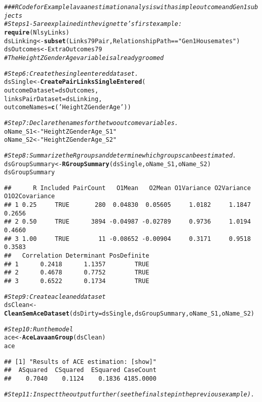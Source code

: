 \documentclass{article}\usepackage[]{graphicx}\usepackage[]{color}
\makeatletter
\newcommand{\hlstr}[1]{\textcolor[rgb]{0.192,0.494,0.8}{#1}}%
\newcommand{\hlcom}[1]{\textcolor[rgb]{0.678,0.584,0.686}{\textit{#1}}}%
\newcommand{\hlopt}[1]{\textcolor[rgb]{0,0,0}{#1}}%
\newcommand{\hlstd}[1]{\textcolor[rgb]{0.345,0.345,0.345}{#1}}%
\newcommand{\hlkwb}[1]{\textcolor[rgb]{0.69,0.353,0.396}{#1}}%
\newcommand{\hlkwc}[1]{\textcolor[rgb]{0.333,0.667,0.333}{#1}}%
\newcommand{\hlkwd}[1]{\textcolor[rgb]{0.737,0.353,0.396}{\textbf{#1}}}%
\newenvironment{kframe}{%
 \def\at@end@of@kframe{}%
 \ifinner\ifhmode%
  \def\at@end@of@kframe{\end{minipage}}%
  \begin{minipage}{\columnwidth}%
 \fi\fi%
 \def\FrameCommand##1{\hskip\@totalleftmargin \hskip-\fboxsep
 \colorbox{shadecolor}{##1}\hskip-\fboxsep
     \hskip-\linewidth \hskip-\@totalleftmargin \hskip\columnwidth}%
 \MakeFramed {\advance\hsize-\width
   \@totalleftmargin\z@ \linewidth\hsize
   \@setminipage}}%
 {\par\unskip\endMakeFramed%
 \at@end@of@kframe}
\newenvironment{knitrout}{}{} %
\makeatother
\begin{document}
\begin{knitrout}
\color{fgcolor}\begin{kframe}
\begin{alltt}
\hlcom{### R Code for Example lavaan estimation analysis with a simple outcome and Gen1 subjects}
\hlcom{#Steps 1-5 are explained in the vignette's first example:}
\hlkwd{require}\hlstd{(NlsyLinks)}
\hlstd{dsLinking} \hlkwb{<-} \hlkwd{subset}\hlstd{(Links79Pair, RelationshipPath}\hlopt{==}\hlstr{"Gen1Housemates"}\hlstd{)}
\hlstd{dsOutcomes} \hlkwb{<-} \hlstd{ExtraOutcomes79}
\hlcom{#The HeightZGenderAge variable is already groomed}

\hlcom{#Step 6: Create the single entered dataset.}
\hlstd{dsSingle} \hlkwb{<-} \hlkwd{CreatePairLinksSingleEntered}\hlstd{(}
  \hlkwc{outcomeDataset}   \hlstd{= dsOutcomes,}
  \hlkwc{linksPairDataset} \hlstd{= dsLinking,}
  \hlkwc{outcomeNames}     \hlstd{=} \hlkwd{c}\hlstd{(}\hlstr{'HeightZGenderAge'}\hlstd{))}

\hlcom{#Step 7: Declare the names for the two outcome variables. }
\hlstd{oName_S1} \hlkwb{<-} \hlstr{"HeightZGenderAge_S1"}
\hlstd{oName_S2} \hlkwb{<-} \hlstr{"HeightZGenderAge_S2"}

\hlcom{#Step 8: Summarize the R groups and determine which groups can be estimated.}
\hlstd{dsGroupSummary} \hlkwb{<-} \hlkwd{RGroupSummary}\hlstd{(dsSingle, oName_S1, oName_S2)}
\hlstd{dsGroupSummary}
\end{alltt}
\begin{verbatim}
##      R Included PairCount   O1Mean   O2Mean O1Variance O2Variance O1O2Covariance
## 1 0.25     TRUE       280  0.04830  0.05605     1.0182     1.1847         0.2656
## 2 0.50     TRUE      3894 -0.04987 -0.02789     0.9736     1.0194         0.4660
## 3 1.00     TRUE        11 -0.08652 -0.00904     0.3171     0.9518         0.3583
##   Correlation Determinant PosDefinite
## 1      0.2418      1.1357        TRUE
## 2      0.4678      0.7752        TRUE
## 3      0.6522      0.1734        TRUE
\end{verbatim}
\begin{alltt}
\hlcom{#Step 9: Create a cleaned dataset}
\hlstd{dsClean} \hlkwb{<-} \hlkwd{CleanSemAceDataset}\hlstd{(}\hlkwc{dsDirty}\hlstd{=dsSingle, dsGroupSummary, oName_S1, oName_S2)}

\hlcom{#Step 10: Run the model}
\hlstd{ace} \hlkwb{<-} \hlkwd{AceLavaanGroup}\hlstd{(dsClean)}
\hlstd{ace}
\end{alltt}
\begin{verbatim}
## [1] "Results of ACE estimation: [show]"
##  ASquared  CSquared  ESquared CaseCount 
##    0.7040    0.1124    0.1836 4185.0000
\end{verbatim}
\begin{alltt}
\hlcom{#Step 11: Inspect the output further (see the final step in the previous example).}
\end{alltt}
\end{kframe}
\end{knitrout}
\end{document}
